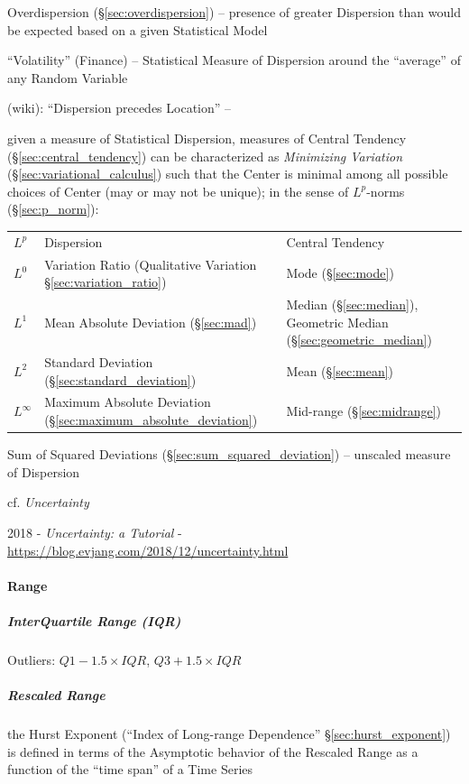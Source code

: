 Overdispersion (\S\ref{sec:overdispersion}) -- presence of greater Dispersion
than would be expected based on a given Statistical Model

``Volatility'' (Finance) -- Statistical Measure of Dispersion around the
``average'' of any Random Variable

(wiki): ``Dispersion precedes Location'' --

given a measure of Statistical Dispersion, measures of Central Tendency
(\S\ref{sec:central_tendency}) can be characterized as \emph{Minimizing
  Variation} (\S\ref{sec:variational_calculus}) such that the Center is
minimal among all possible choices of Center (may or may not be unique); in the
sense of $L^p$-norms (\S\ref{sec:p_norm}):
\begin{tabular}{l l l}
  $L^p$ & Dispersion & Central Tendency \\
  $L^0$ & Variation Ratio (Qualitative Variation \S\ref{sec:variation_ratio})
    & Mode (\S\ref{sec:mode}) \\
  $L^1$ & Mean Absolute Deviation (\S\ref{sec:mad})
    & Median (\S\ref{sec:median}),
      Geometric Median (\S\ref{sec:geometric_median}) \\
  $L^2$ & Standard Deviation (\S\ref{sec:standard_deviation})
    & Mean (\S\ref{sec:mean}) \\
  $L^\infty$
    & Maximum Absolute Deviation (\S\ref{sec:maximum_absolute_deviation})
    & Mid-range (\S\ref{sec:midrange})
\end{tabular}

\fist Sum of Squared Deviations (\S\ref{sec:sum_squared_deviation}) -- unscaled
measure of Dispersion

cf. \emph{Uncertainty}

2018 - \emph{Uncertainty: a Tutorial} -
\url{https://blog.evjang.com/2018/12/uncertainty.html}



\paragraph{Range}\label{sec:range}\hfill

\subparagraph{InterQuartile Range (IQR)}\label{sec:iqr}\hfill

Outliers:  $Q1 - 1.5 \times IQR$, $Q3 + 1.5 \times IQR$



\subparagraph{Rescaled Range}\label{sec:rescaled_range}\hfill

\fist the Hurst Exponent (``Index of Long-range Dependence''
\S\ref{sec:hurst_exponent}) is defined in terms of the Asymptotic behavior of
the Rescaled Range as a function of the ``time span'' of a Time Series

